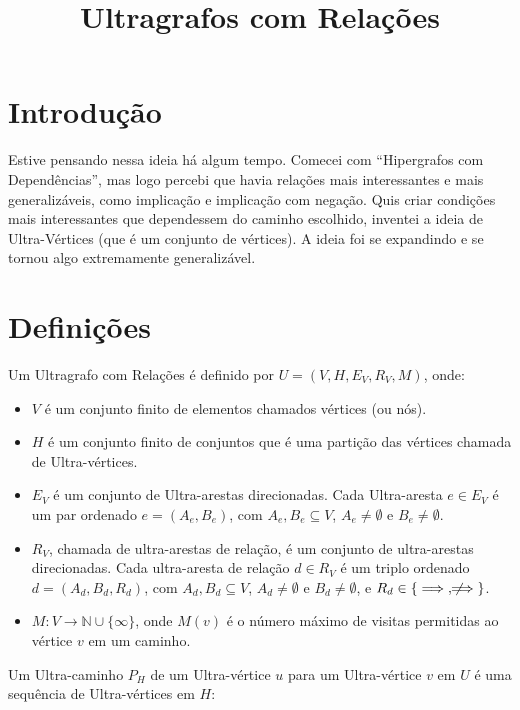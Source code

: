 \documentclass{article}
\title{Ultragrafos com Relações}
\author{}
\begin{document}
\maketitle

\section{Introdução}

Estive pensando nessa ideia há algum tempo. Comecei com ``Hipergrafos com Dependências'', mas logo percebi que havia relações mais interessantes e mais generalizáveis, como implicação e implicação com negação. Quis criar condições mais interessantes que dependessem do caminho escolhido, inventei a ideia de Ultra-Vértices (que é um conjunto de vértices). A ideia foi se expandindo e se tornou algo extremamente generalizável.

\section{Definições}

Um Ultragrafo com Relações é definido por \( U = (V, H, E_V, R_V, M) \), onde:

\begin{itemize}
    \item \( V \) é um conjunto finito de elementos chamados vértices (ou nós).
    \item \( H \) é um conjunto finito de conjuntos que é uma partição das vértices chamada de Ultra-vértices.
    \item \( E_V \) é um conjunto de Ultra-arestas direcionadas. Cada Ultra-aresta \( e \in E_V \) é um par ordenado \( e = (A_e, B_e) \), com \( A_e, B_e \subseteq V \), \( A_e \neq \emptyset \) e \( B_e \neq \emptyset \).
    \item \( R_V \), chamada de ultra-arestas de relação, é um conjunto de ultra-arestas direcionadas. Cada ultra-aresta de relação \( d \in R_V \) é um triplo ordenado \( d = (A_d, B_d, R_d) \), com \( A_d, B_d \subseteq V \), \( A_d \neq \emptyset \) e \( B_d \neq \emptyset \), e \( R_d \in \{\implies, \not\!\!\!\implies\} \).
    \item \( M: V \to \mathbb{N} \cup \{\infty\} \), onde \( M(v) \) é o número máximo de visitas permitidas ao vértice \( v \) em um caminho.
\end{itemize}

Um Ultra-caminho \( P_H \) de um Ultra-vértice \( u \) para um Ultra-vértice \( v \) em \( U \) é uma sequência de Ultra-vértices em \( H \):
\end{document}
